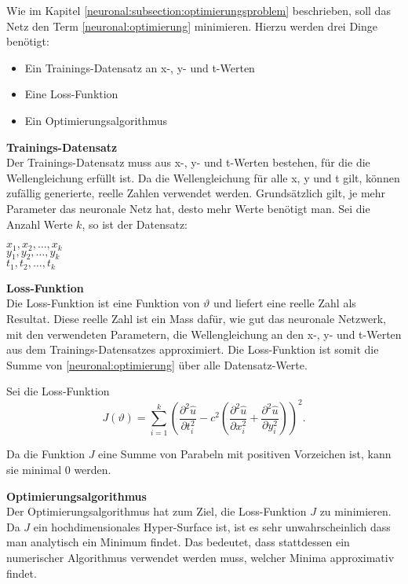 Wie im Kapitel \ref{neuronal:subsection:optimierungsproblem} beschrieben, soll das Netz den Term \eqref{neuronal:optimierung} minimieren.
Hierzu werden drei Dinge benötigt:
\begin{itemize}
    \item Ein Trainings-Datensatz an x-, y- und t-Werten
    \item Eine Loss-Funktion
    \item Ein Optimierungsalgorithmus\\
\end{itemize}

\textbf{Trainings-Datensatz}\\
Der Trainings-Datensatz muss aus x-, y- und t-Werten bestehen, für die die Wellengleichung erfüllt ist.
Da die Wellengleichung für alle x, y und t gilt, können zufällig generierte, reelle Zahlen verwendet werden.
Grundsätzlich gilt, je mehr Parameter das neuronale Netz hat, desto mehr Werte benötigt man.
Sei die Anzahl Werte \( k \), so ist der Datensatz:
\begin{center}
    \( x_1, x_2, \ldots, x_k \)\\
    \( y_1, y_2, \ldots, y_k \)\\
    \( t_1, t_2, \ldots, t_k \)\\
\end{center}



\textbf{Loss-Funktion}\\
Die Loss-Funktion ist eine Funktion von \( \vartheta \) und liefert eine reelle Zahl als Resultat.
Diese reelle Zahl ist ein Mass dafür, wie gut das neuronale Netzwerk, mit den verwendeten Parametern, die Wellengleichung an den x-, y- und t-Werten aus dem Trainings-Datensatzes approximiert.
Die Loss-Funktion ist somit die Summe von \eqref{neuronal:optimierung} über alle Datensatz-Werte.

Sei die Loss-Funktion
\begin{equation}
    J(\vartheta) = \sum_{i=1}^{k} \left(\frac{\partial^2 \hat{u}}{\partial t_i^2} - c^2 \left( \frac{\partial^2 \hat{u}}{\partial x_i^2} + \frac{\partial^2 \hat{u}}{\partial y_i^2} \right)\right)^2.
    \label{neuronal:loss}
\end{equation}

Da die Funktion \( J \) eine Summe von Parabeln mit positiven Vorzeichen ist, kann sie minimal 0 werden.

\textbf{Optimierungsalgorithmus}\\
Der Optimierungsalgorithmus hat zum Ziel, die Loss-Funktion \( J \) zu minimieren.
Da \( J \) ein hochdimensionales Hyper-Surface ist, ist es sehr unwahrscheinlich dass man analytisch ein Minimum findet.
Das bedeutet, dass stattdessen ein numerischer Algorithmus verwendet werden muss, welcher Minima approximativ findet.


